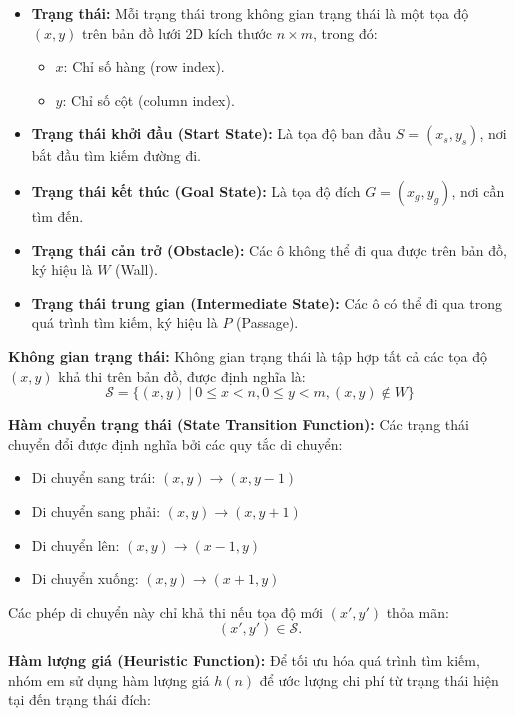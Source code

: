 \begin{itemize}
    \item \textbf{Trạng thái:} 
    Mỗi trạng thái trong không gian trạng thái là một tọa độ $(x, y)$ trên bản đồ lưới 2D kích thước $n \times m$, trong đó:
    \begin{itemize}
        \item $x$: Chỉ số hàng (row index).
        \item $y$: Chỉ số cột (column index).
    \end{itemize}
    
    \item \textbf{Trạng thái khởi đầu (Start State):} 
    Là tọa độ ban đầu $S = (x_s, y_s)$, nơi bắt đầu tìm kiếm đường đi.

    \item \textbf{Trạng thái kết thúc (Goal State):} 
    Là tọa độ đích $G = (x_g, y_g)$, nơi cần tìm đến.

    \item \textbf{Trạng thái cản trở (Obstacle):} 
    Các ô không thể đi qua được trên bản đồ, ký hiệu là $W$ (Wall).

    \item \textbf{Trạng thái trung gian (Intermediate State):}
    Các ô có thể đi qua trong quá trình tìm kiếm, ký hiệu là $P$ (Passage).
\end{itemize}

\textbf{Không gian trạng thái:} 
Không gian trạng thái là tập hợp tất cả các tọa độ $(x, y)$ khả thi trên bản đồ, được định nghĩa là:
\[
\mathcal{S} = \{(x, y) \ | \ 0 \leq x < n, 0 \leq y < m, (x, y) \notin W \}
\]

\textbf{Hàm chuyển trạng thái (State Transition Function):} 
Các trạng thái chuyển đổi được định nghĩa bởi các quy tắc di chuyển:
\begin{itemize}
    \item Di chuyển sang trái: $(x, y) \rightarrow (x, y-1)$
    \item Di chuyển sang phải: $(x, y) \rightarrow (x, y+1)$
    \item Di chuyển lên: $(x, y) \rightarrow (x-1, y)$
    \item Di chuyển xuống: $(x, y) \rightarrow (x+1, y)$
\end{itemize}

Các phép di chuyển này chỉ khả thi nếu tọa độ mới $(x', y')$ thỏa mãn:
\[
(x', y') \in \mathcal{S}.
\]

\textbf{Hàm lượng giá (Heuristic Function):} 
Để tối ưu hóa quá trình tìm kiếm, nhóm em sử dụng hàm lượng giá $h(n)$ để ước lượng chi phí từ trạng thái hiện tại đến trạng thái đích:

